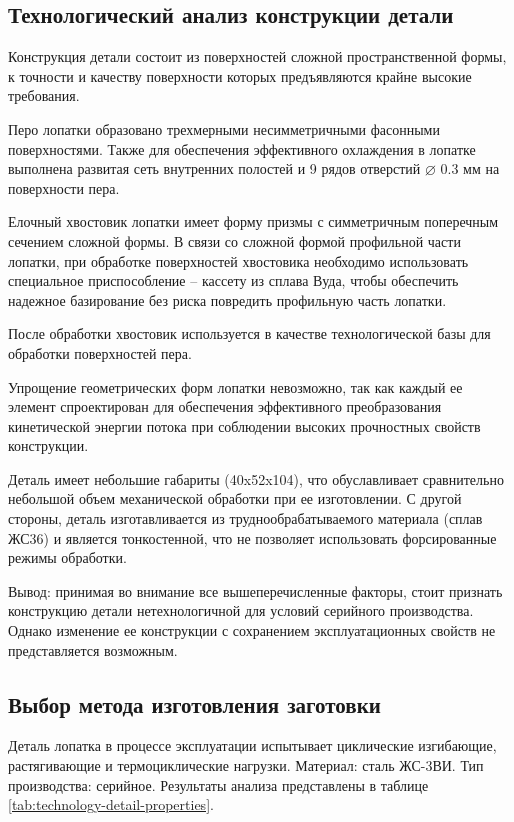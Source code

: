 \subsection{Технологический анализ конструкции детали}

Конструкция детали состоит из поверхностей сложной пространственной формы, к точности и качеству поверхности которых предъявляются крайне высокие требования.

Перо лопатки образовано трехмерными несимметричными фасонными поверхностями. Также для обеспечения эффективного охлаждения в лопатке выполнена развитая сеть внутренних полостей и 9 рядов отверстий $\diameter$ 0.3 мм на поверхности пера.

Елочный хвостовик лопатки имеет форму призмы с симметричным поперечным сечением сложной формы. В связи со сложной формой профильной части лопатки, при обработке поверхностей хвостовика необходимо использовать специальное приспособление – кассету из сплава Вуда, чтобы обеспечить надежное базирование без риска повредить профильную часть лопатки.

После обработки хвостовик используется в качестве технологической базы для обработки поверхностей пера.

Упрощение геометрических форм лопатки невозможно, так как каждый ее элемент спроектирован для обеспечения эффективного преобразования кинетической энергии потока при соблюдении высоких прочностных свойств конструкции.

Деталь имеет небольшие габариты (40x52x104), что обуславливает сравнительно небольшой объем механической обработки при ее изготовлении. С другой стороны, деталь изготавливается из труднообрабатываемого материала (сплав ЖС36) и является тонкостенной, что не позволяет использовать форсированные режимы обработки.

Вывод: принимая во внимание все вышеперечисленные факторы, стоит признать конструкцию детали нетехнологичной для условий серийного производства. Однако изменение ее конструкции с сохранением эксплуатационных свойств не представляется возможным.

\subsection{Выбор метода изготовления заготовки}
Деталь лопатка в процессе эксплуатации испытывает циклические изгибающие, растягивающие и термоциклические нагрузки. Материал: сталь ЖС-3ВИ. Тип производства: серийное.
Результаты анализа представлены в таблице \ref{tab:technology-detail-properties}.

